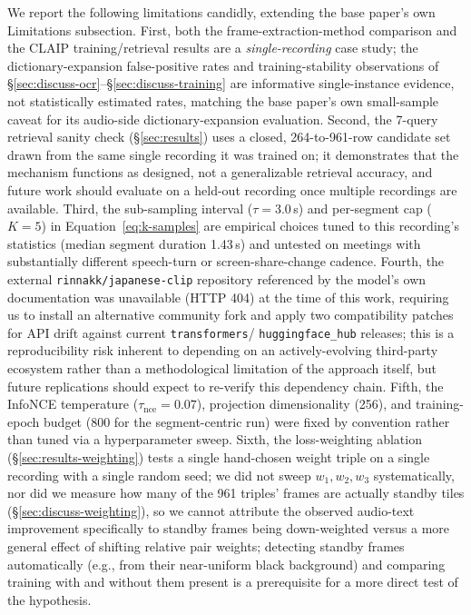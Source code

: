 ﻿\documentclass[twocolumn]{article}
\begin{document}
We report the following limitations candidly, extending the base paper's own Limitations
subsection. First, both the frame-extraction-method comparison and the CLAIP training/retrieval
results are a \emph{single-recording} case study; the dictionary-expansion false-positive rates and
training-stability observations of \S\ref{sec:discuss-ocr}--\S\ref{sec:discuss-training} are
informative single-instance evidence, not statistically estimated rates, matching the base paper's
own small-sample caveat for its audio-side dictionary-expansion evaluation. Second, the 7-query
retrieval sanity check (\S\ref{sec:results}) uses a closed, 264-to-961-row candidate set drawn from
the same single recording it was trained on; it demonstrates that the mechanism functions as
designed, not a generalizable retrieval accuracy, and future work should evaluate on a held-out
recording once multiple recordings are available. Third, the sub-sampling interval ($\tau=3.0$\,s)
and per-segment cap ($K=5$) in Equation~\ref{eq:k-samples} are empirical choices tuned to this
recording's statistics (median segment duration 1.43\,s) and untested on meetings with
substantially different speech-turn or screen-share-change cadence. Fourth, the external
\texttt{rinnakk/japanese-clip} repository referenced by the model's own documentation was
unavailable (HTTP 404) at the time of this work, requiring us to install an alternative community
fork and apply two compatibility patches for API drift against current \texttt{transformers}/
\texttt{huggingface\_hub} releases; this is a reproducibility risk inherent to depending on an
actively-evolving third-party ecosystem rather than a methodological limitation of the approach
itself, but future replications should expect to re-verify this dependency chain. Fifth, the
InfoNCE temperature ($\tau_{\text{nce}}=0.07$), projection dimensionality (256), and training-epoch
budget (800 for the segment-centric run) were fixed by convention rather than tuned via a
hyperparameter sweep. Sixth, the loss-weighting ablation (\S\ref{sec:results-weighting}) tests a
single hand-chosen weight triple on a single recording with a single random seed; we did not sweep
$w_1, w_2, w_3$ systematically, nor did we measure how many of the 961 triples' frames are actually
standby tiles (\S\ref{sec:discuss-weighting}), so we cannot attribute the observed audio-text
improvement specifically to standby frames being down-weighted versus a more general effect of
shifting relative pair weights; detecting standby frames automatically (e.g., from their
near-uniform black background) and comparing training with and without them present is a
prerequisite for a more direct test of the hypothesis.
\end{document}
